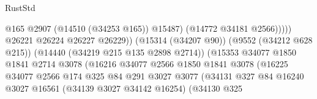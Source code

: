 \begin{lexlean}{RustStd}
\begin{coremodule}
                                                              @165
                                                              @2907
                                                              (@14510 (@34253 @165))
                                                              @15487)
                                                            (@14772 @34181 @2566)))))
                                                    @26221
                                                    @26224
                                                    @26227
                                                    @26229))
                                                (@15314 (@34207 @90))
                                                (@9552 (@34212 @628 @215))
                                                (@14440 (@34219 @215 @135 @2898 @2714))
                                                (@15353
                                                  @34077
                                                  @1850
                                                  @1841
                                                  @2714
                                                  @3078
                                                  (@16216
                                                    @34077
                                                    @2566
                                                    @1850
                                                    @1841
                                                    @3078
                                                    (@16225
                                                      @34077
                                                      @2566
                                                      @174
                                                      @325
                                                      @84
                                                      @291
                                                      @3027
                                                      @3077
                                                      (@34131
                                                        @327
                                                        @84
                                                        @16240
                                                        @3027
                                                        @16561
                                                        (@34139 @3027 @34142 @16254)
                                                        (@34130
                                                          @325

\end{coremodule}
\end{lexlean}
